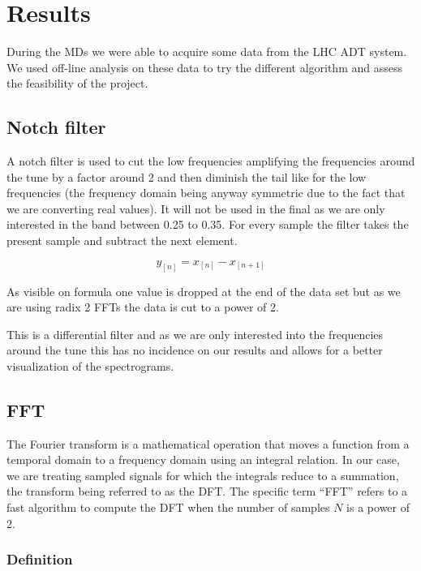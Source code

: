 %

\chapter{Results}

During the \glspl{MD} we were able to acquire some data from the \gls{LHC} \gls{ADT} system. We used off-line analysis on these data to try the different algorithm and assess the feasibility of the project.

\section{Notch filter}
\label{sec:notch}

A notch filter is used to cut the low frequencies amplifying the frequencies around the tune by a factor around 2 and then diminish the tail like for the low frequencies (the frequency domain being anyway symmetric due to the fact that we are converting real values). It will not be used in the final as we are only interested in the band between 0.25 to 0.35. For every sample the filter takes the present sample and subtract the next element. 

$$y_{[n]} = x_{[n]} - x_{[n + 1]}$$

As visible on formula one value is dropped at the end of the data set but as we are using radix 2 \glspl{FFT} the data is cut to a power of 2.

This is a differential filter and as we are only interested into the frequencies around the tune this has no incidence on our results and allows for a better visualization of the spectrograms.

\section{FFT}
\label{sec:FFT}

The Fourier transform is a mathematical operation that moves a function from a temporal domain to a frequency domain using an integral relation. In our case, we are treating sampled signals for which the integrals reduce to a summation, the transform being referred to as the \gls{DFT}. The specific term ``\gls{FFT}'' refers to a fast algorithm to compute the \gls{DFT} when the number of samples $N$ is a power of 2.

\subsection{Definition}

